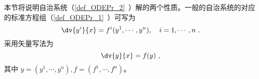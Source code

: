 
本节将说明自治系统（\autoref{def_ODEPr_2}~）解的两个性质。一般的自治系统的对应的标准方程组（\autoref{def_ODEPr_1}~）可写为
\begin{equation}
\dv{y^i}{x}=f^i(y^1,\cdots,y^n),\quad i=1,\cdots,n~.
\end{equation}
采用矢量写法为
\begin{equation}
\dv{y}{x}=f(y)~,
\end{equation}
其中 $y=(y^1,\cdots,y^n),f=(f^1,\cdots,f^n)$。
